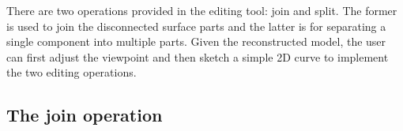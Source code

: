 There are two operations provided in  the editing tool: join and
split. The former is used to join the disconnected surface parts and
the latter is for separating a single component into multiple parts.
Given the reconstructed model, the user can first adjust the
viewpoint and then sketch a simple 2D curve to implement the two
editing operations.


\subsection{The join operation}
\label{ch6:sec:edit:join}

\begin{figure} [htbp]
  \centering
  \subfigure[]{
    \centering
    \label{fig:fp:b}
}
\end{figure}

